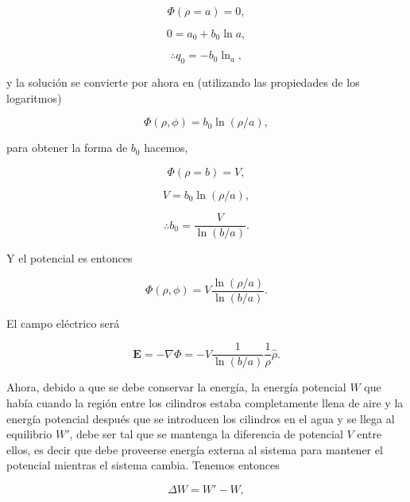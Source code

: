 \documentclass[a4paper,11pt]{article}
\numberwithin{equation}{section}
\begin{document}
\begin{equation}
 \Phi(\rho = a) = 0,
\end{equation}

\begin{equation}
 0 = a_0 + b_0\ln{a},
\end{equation}

\begin{equation}
 \therefore q_0 = - b_0 \ln_a,
\end{equation}

y la solución se convierte por ahora en (utilizando las propiedades de los logaritmos)

\begin{equation}
 \Phi(\rho,\phi) = b_0 \ln({\rho/a}),
\end{equation}

para obtener la forma de $b_0$ hacemos, 

\begin{equation}
 \Phi(\rho = b) = V,
\end{equation}

\begin{equation}
 V =  b_0 \ln({\rho/a}),
\end{equation}

\begin{equation}
 \therefore b_0 = \frac{V}{\ln{(b/a)}}.
\end{equation}

Y el potencial es entonces 

\begin{equation}
 \Phi(\rho,\phi) = V \frac{\ln{(\rho/a)}}{\ln{(b/a)}}.
\end{equation}

El campo eléctrico será 

\begin{equation}
 \mathbf{E} = -\nabla \Phi = - V \frac{1}{\ln{(b/a)}}\frac{1}{\rho} \hat{\rho}.
\end{equation}

Ahora, debido a que se debe conservar la energía, la energía potencial $W$ que 
había cuando la región entre los cilindros estaba completamente llena de aire y
la energía potencial después que se introducen los cilindros en el agua y se llega 
al equilibrio $W'$, debe ser tal que se mantenga la diferencia de potencial $V$ 
entre ellos, es decir que debe proveerse energía externa al sistema para mantener 
el potencial mientras el sistema cambia. Tenemos entonces 

\begin{equation}
 \Delta W = W' - W,
\end{equation}
\end{document}
